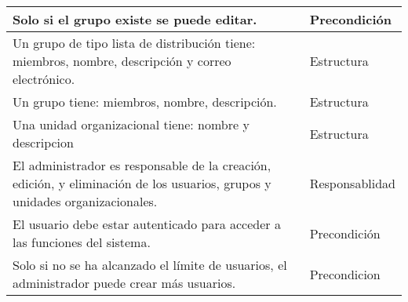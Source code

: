 \begin{longtable}{|p{10cm}|l|}
    Solo si el grupo existe se puede editar.                                                                                                                                                                                                                                                                             & Precondición    \\ \hline
    Un grupo de tipo lista de distribución tiene: miembros, nombre, descripción y correo electrónico.                                                                                                                                                                                                                    & Estructura      \\ \hline
    Un grupo tiene: miembros, nombre, descripción.                                                                                                                                                                                                                                                                       & Estructura      \\ \hline
    Una unidad organizacional tiene: nombre y descripcion                                                                                                                                                                                                                                                                & Estructura      \\ \hline
    El administrador es responsable de la creación, edición, y eliminación de los usuarios, grupos y unidades organizacionales.                                                                                                                                                                                          & Responsablidad  \\ \hline
    El usuario debe estar autenticado para acceder a las funciones del sistema.                                                                                                                                                                                                                                          & Precondición    \\ \hline
    Solo si no se ha alcanzado el límite de usuarios, el administrador puede crear más usuarios.                                                                                                                                                                                                                         & Precondicion    \\ \hline

\end{longtable}
